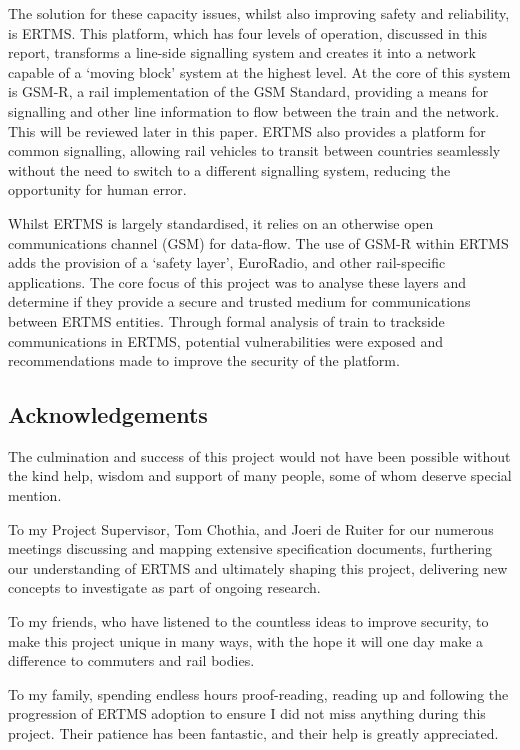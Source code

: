 The solution for these capacity issues, whilst also improving safety and reliability, is ERTMS. This platform, which has four levels of operation, discussed in this report, transforms a line-side signalling system and creates it into a network capable of a `moving block' system at the highest level. At the core of this system is GSM-R, a rail implementation of the GSM Standard, providing a means for signalling and other line information to flow between the train and the network. This will be reviewed later in this paper. ERTMS also provides a platform for common signalling, allowing rail vehicles to transit between countries seamlessly without the need to switch to a different signalling system, reducing the opportunity for human error.

Whilst ERTMS is largely standardised, it relies on an otherwise open communications channel (GSM) for data-flow. The use of GSM-R within ERTMS adds the provision of a `safety layer', EuroRadio, and other rail-specific applications. The core focus of this project was to analyse these layers and determine if they provide a secure and trusted medium for communications between ERTMS entities. Through formal analysis of train to trackside communications in ERTMS, potential vulnerabilities were exposed and recommendations made to improve the security of the platform.

\subsection{Acknowledgements}
The culmination and success of this project would not have been possible without the kind help, wisdom and support of many people, some of whom deserve special mention.

To my Project Supervisor, Tom Chothia, and Joeri de Ruiter for our numerous meetings discussing and mapping extensive specification documents, furthering our understanding of ERTMS and ultimately shaping this project, delivering new concepts to investigate as part of ongoing research.

To my friends, who have listened to the countless ideas to improve security, to make this project unique in many ways, with the hope it will one day make a difference to commuters and rail bodies.

To my family, spending endless hours proof-reading, reading up and following the progression of ERTMS adoption to ensure I did not miss anything during this project. Their patience has been fantastic, and their help is greatly appreciated.


\clearpage
